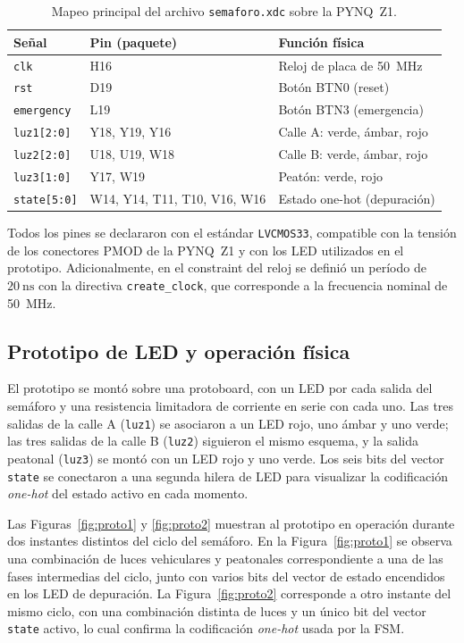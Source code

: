 \documentclass[12pt,letterpaper]{article}
\begin{document}
\begin{table}[H]
\centering
\caption{Mapeo principal del archivo \texttt{semaforo.xdc} sobre la PYNQ~Z1.}
\label{tab:constraints}
\begin{tabular}{C{3.5cm}C{3.5cm}C{5.5cm}}
\toprule
Señal & Pin (paquete) & Función física \\
\midrule
\texttt{clk}        & H16 & Reloj de placa de \SI{50}{\mega\hertz} \\
\texttt{rst}        & D19 & Botón BTN0 (reset) \\
\texttt{emergency}  & L19 & Botón BTN3 (emergencia) \\
\texttt{luz1[2:0]}  & Y18, Y19, Y16 & Calle A: verde, ámbar, rojo \\
\texttt{luz2[2:0]}  & U18, U19, W18 & Calle B: verde, ámbar, rojo \\
\texttt{luz3[1:0]}  & Y17, W19      & Peatón: verde, rojo \\
\texttt{state[5:0]} & W14, Y14, T11, T10, V16, W16 & Estado one-hot (depuración) \\
\bottomrule
\end{tabular}
\end{table}

Todos los pines se declararon con el estándar \texttt{LVCMOS33}, compatible con la tensión de los conectores PMOD de la PYNQ~Z1 y con los LED utilizados en el prototipo. Adicionalmente, en el constraint del reloj se definió un período de $\SI{20}{\nano\second}$ con la directiva \texttt{create\_clock}, que corresponde a la frecuencia nominal de \SI{50}{\mega\hertz}.

\subsection{Prototipo de LED y operación física}
El prototipo se montó sobre una protoboard, con un LED por cada salida del semáforo y una resistencia limitadora de corriente en serie con cada uno. Las tres salidas de la calle A (\texttt{luz1}) se asociaron a un LED rojo, uno ámbar y uno verde; las tres salidas de la calle B (\texttt{luz2}) siguieron el mismo esquema, y la salida peatonal (\texttt{luz3}) se montó con un LED rojo y uno verde. Los seis bits del vector \texttt{state} se conectaron a una segunda hilera de LED para visualizar la codificación \textit{one-hot} del estado activo en cada momento.

Las Figuras~\ref{fig:proto1} y \ref{fig:proto2} muestran al prototipo en operación durante dos instantes distintos del ciclo del semáforo. En la Figura~\ref{fig:proto1} se observa una combinación de luces vehiculares y peatonales correspondiente a una de las fases intermedias del ciclo, junto con varios bits del vector de estado encendidos en los LED de depuración. La Figura~\ref{fig:proto2} corresponde a otro instante del mismo ciclo, con una combinación distinta de luces y un único bit del vector \texttt{state} activo, lo cual confirma la codificación \textit{one-hot} usada por la FSM.
\end{document}
